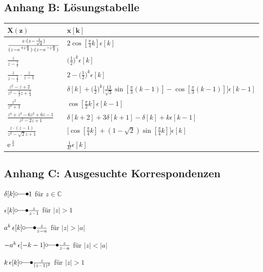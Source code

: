 \documentclass[11pt,a4paper,DIV=12]{scrartcl}
\begin{document}
\newpage
\subsection{Anhang B: Lösungstabelle}
\label{sec:AnhangB}
\begin{center}
	\begin{tabular}{|l|l|}
		\hline
		$\mathbf{X(z)}$ & $\mathbf{x[k]}$ \\
		\hline
		$\frac{z\cdot(z-\frac{1}{\sqrt{2}})}{(z-\e^{+\im\frac{\pi}{4}})\cdot(z-\e^{-\im\frac{\pi}{4}})}$ & $2\cos[\frac{\pi}{4}k]\epsilon[k]$ \\
		\hline
		$\frac{z}{z-\frac{1}{2}}$ & $\bigg (\frac{1}{2} \bigg)^{k}\epsilon[k]$ \\
		\hline
		$\frac{z}{z-\frac{1}{2}}\cdot\frac{z}{z-1} $ & $2-\bigg(\frac{1}{2}\bigg)^k\epsilon[k] $\\[2ex]
		\hline
		$\frac{z^2-z+2}{z^2-\frac{1}{2}z+\frac{1}{4}}$ & $\delta[k]+\bigg(\frac{1}{2}\bigg)^k\Bigg[\frac{13}{\sqrt{3}}\sin[\frac{\pi}{3}(k-1)]-\cos[\frac{\pi}{3}(k-1)]\Bigg]\epsilon[k-1]$ \\
		\hline
		$\frac{z^2}{z^2+1}$ & $\cos[\frac{\pi}{2}k]\epsilon[k-1]$\\
		\hline
		$\frac{z^4+z^3-6z^2+6z-1}{z^2-2z+1}$ & $\delta[k+2]+3\delta[k+1]-\delta[k]+k\epsilon[k-1]$\\
		\hline
		$\frac{z\cdot(z-1)}{z^2-\sqrt{2}z+1}$ & $\Bigg[\cos[\frac{\pi}{4}k]+(1-\sqrt{2})\sin[\frac{\pi}{4}k]\Bigg] \epsilon[k]$\\
		\hline
		$\e^{\frac{1}{z}}$ & $\frac{1}{k!}\epsilon[k]$ \\
		\hline
	\end{tabular}
\end{center}


\subsection{Anhang C: Ausgesuchte Korrespondenzen}
\label{sec:AnhangC}

\noindent $\delta[k] \laplace 1$ für $z \in \mathbb{C}$

\noindent $\epsilon[k] \laplace \frac{z}{z-1}$  für $|z| > 1$

\noindent $a^k \, \epsilon[k] \laplace \frac{z}{z-a}$ für $|z| > |a|$

\noindent $-a^k \, \epsilon[-k-1] \laplace \frac{z}{z-a}$ für $|z| < |a|$

\noindent $k \, \epsilon[k] \laplace \frac{z}{(z-1)^2}$ für $|z| > 1$
\end{document}

